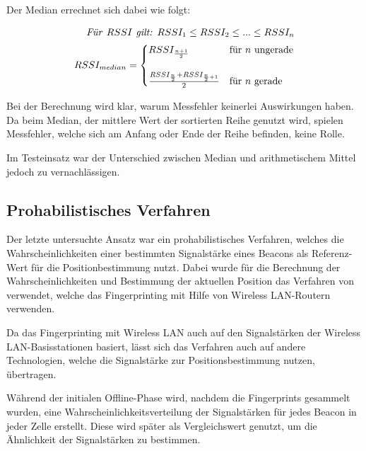 Der Median errechnet sich dabei wie folgt: 

\begin{equation}
	\begin{split}
	\text{\emph{Für }}RSSI \text{\emph{ gilt: }} RSSI_{1} \leq RSSI_{2} \leq ... \leq RSSI_{n} \\
	RSSI_{median}=\begin{cases}
	RSSI_{\frac{n+1}{2}} & \text{für } n \text{ ungerade}\\ \\
	\frac{RSSI_{\frac{n}{2}} + RSSI_{\frac{n}{2}+1}}{2} & \text{für } n \text{ gerade} \\
	\end{cases}
	\end{split}
\end{equation}

Bei der Berechnung wird klar, warum Messfehler keinerlei Auswirkungen haben. Da beim Median, der mittlere Wert der sortierten Reihe genutzt wird, spielen Messfehler, welche sich am Anfang oder Ende der Reihe befinden, keine Rolle.

Im Testeinsatz war der Unterschied zwischen Median und arithmetischem Mittel jedoch zu vernachlässigen. 


\subsection{Prohabilistisches Verfahren}
\label{sec:implementation:fingerprinting:positioning:probability}
Der letzte untersuchte Ansatz war ein prohabilistisches Verfahren, welches die Wahrscheinlichkeiten einer bestimmten Signalstärke eines Beacons als Referenz-Wert für die Positionbestimmung nutzt. Dabei wurde für die Berechnung der Wahrscheinlichkeiten und Bestimmung der aktuellen Position das Verfahren von \citet{wifiFingerprintProbability} verwendet, welche das Fingerprinting mit Hilfe von Wireless LAN-Routern verwenden.

Da das Fingerprinting mit Wireless LAN auch auf den Signalstärken der Wireless LAN-Basisstationen basiert, lässt sich das Verfahren auch auf andere Technologien, welche die Signalstärke zur Positionsbestimmung nutzen, übertragen.

Während der initialen Offline-Phase wird, nachdem die Fingerprints gesammelt wurden, eine Wahrscheinlichkeitsverteilung der Signalstärken für jedes Beacon in jeder Zelle erstellt. Diese wird später als Vergleichswert genutzt, um die Ähnlichkeit der Signalstärken zu bestimmen.

